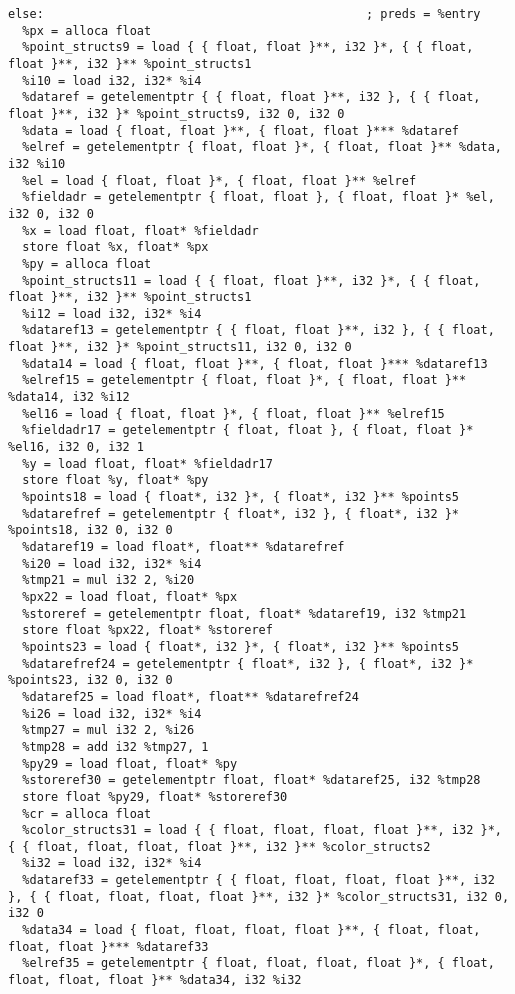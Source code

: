 \documentclass[main.tex]{subfiles}
\begin{document}
{\begin{lstlisting}
else:                                             ; preds = %entry
  %px = alloca float
  %point_structs9 = load { { float, float }**, i32 }*, { { float, float }**, i32 }** %point_structs1
  %i10 = load i32, i32* %i4
  %dataref = getelementptr { { float, float }**, i32 }, { { float, float }**, i32 }* %point_structs9, i32 0, i32 0
  %data = load { float, float }**, { float, float }*** %dataref
  %elref = getelementptr { float, float }*, { float, float }** %data, i32 %i10
  %el = load { float, float }*, { float, float }** %elref
  %fieldadr = getelementptr { float, float }, { float, float }* %el, i32 0, i32 0
  %x = load float, float* %fieldadr
  store float %x, float* %px
  %py = alloca float
  %point_structs11 = load { { float, float }**, i32 }*, { { float, float }**, i32 }** %point_structs1
  %i12 = load i32, i32* %i4
  %dataref13 = getelementptr { { float, float }**, i32 }, { { float, float }**, i32 }* %point_structs11, i32 0, i32 0
  %data14 = load { float, float }**, { float, float }*** %dataref13
  %elref15 = getelementptr { float, float }*, { float, float }** %data14, i32 %i12
  %el16 = load { float, float }*, { float, float }** %elref15
  %fieldadr17 = getelementptr { float, float }, { float, float }* %el16, i32 0, i32 1
  %y = load float, float* %fieldadr17
  store float %y, float* %py
  %points18 = load { float*, i32 }*, { float*, i32 }** %points5
  %datarefref = getelementptr { float*, i32 }, { float*, i32 }* %points18, i32 0, i32 0
  %dataref19 = load float*, float** %datarefref
  %i20 = load i32, i32* %i4
  %tmp21 = mul i32 2, %i20
  %px22 = load float, float* %px
  %storeref = getelementptr float, float* %dataref19, i32 %tmp21
  store float %px22, float* %storeref
  %points23 = load { float*, i32 }*, { float*, i32 }** %points5
  %datarefref24 = getelementptr { float*, i32 }, { float*, i32 }* %points23, i32 0, i32 0
  %dataref25 = load float*, float** %datarefref24
  %i26 = load i32, i32* %i4
  %tmp27 = mul i32 2, %i26
  %tmp28 = add i32 %tmp27, 1
  %py29 = load float, float* %py
  %storeref30 = getelementptr float, float* %dataref25, i32 %tmp28
  store float %py29, float* %storeref30
  %cr = alloca float
  %color_structs31 = load { { float, float, float, float }**, i32 }*, { { float, float, float, float }**, i32 }** %color_structs2
  %i32 = load i32, i32* %i4
  %dataref33 = getelementptr { { float, float, float, float }**, i32 }, { { float, float, float, float }**, i32 }* %color_structs31, i32 0, i32 0
  %data34 = load { float, float, float, float }**, { float, float, float, float }*** %dataref33
  %elref35 = getelementptr { float, float, float, float }*, { float, float, float, float }** %data34, i32 %i32

\end{lstlisting}}
\end{document}
